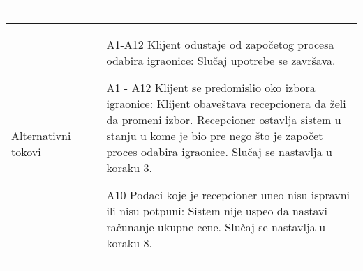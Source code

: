 \documentclass[../../main.tex]{subfiles}
\begin{document}
\begin{longtable}{| p{} | p{} |}
\begin{enumerate}
    \end{enumerate}\\
\hline
    Alternativni tokovi & 
    \begin{itemize}
        \item[A1-A12] Klijent odustaje od započetog procesa odabira igraonice: Slučaj upotrebe se završava.
        \item [A1 - A12] Klijent se predomislio oko izbora igraonice: Klijent obaveštava recepcionera da želi da promeni izbor. Recepcioner ostavlja sistem u stanju u kome je bio pre nego što je započet proces odabira igraonice. Slučaj se nastavlja u koraku 3.
        \item[A10] Podaci koje je recepcioner uneo nisu ispravni ili nisu potpuni: Sistem nije uspeo da nastavi računanje ukupne cene. Slučaj se nastavlja u koraku 8.

\end{itemize}
\end{longtable}
\end{document}
